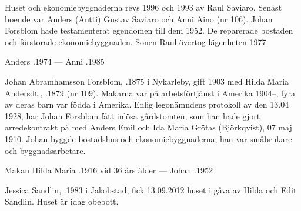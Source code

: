 


Huset och ekonomiebyggnaderna revs 1996 och 1993 av Raul Saviaro. Senast boende var Anders (Antti) Gustav Saviaro och Anni Aino (nr 106). Johan Forsblom hade testamenterat egendomen till dem 1952. De reparerade bostaden och förstorade ekonomiebyggnaden. Sonen Raul övertog lägenheten 1977.

Anders .1974 --- Anni .1985


Johan Abramhamsson Forsblom, .1875 i Nykarleby, gift 1903 med Hilda Maria Andersdt., .1879 (nr 109). Makarna var på arbetsförtjänst i Amerika 1904--, fyra av deras barn var födda i Amerika. Enlig legonämndens protokoll av den 13.04 1928, har Johan Forsblom fått inlösa gårdstomten, som han hade gjort arredekontrakt  på  med Anders Emil och Ida Maria Grötas (Björkqvist), 07 maj 1910. Johan byggde bostadshus och ekonomiebyggnaderna, han var småbrukare och byggnadsarbetare.
\begin{jhchildren}
  \item {}
  \item {}
  \item {}
  \item {}
  \item {}
\end{jhchildren}

Makan Hilda Maria .1916 vid 36 års ålder  ---  Johan .1952






Jessica Sandlin, .1983  i Jakobstad, fick 13.09.2012 huset i gåva av Hilda och Edit Sandlin. Huset är idag obebott.\jhvspace{}



